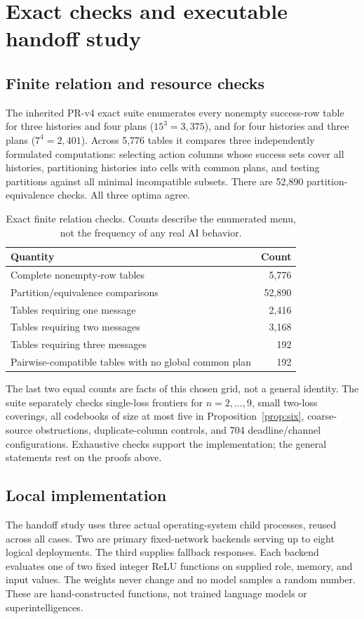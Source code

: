 \documentclass[11pt,a4paper]{article}
\theoremstyle{definition}\newtheorem{definition}{Definition}
\begin{document}
\section{Exact checks and executable handoff study}
\label{sec:evidence}
\subsection{Finite relation and resource checks}
The inherited PR-v4 exact suite enumerates every nonempty success-row table for three histories and four plans ($15^3=3,375$), and for four histories and three plans ($7^4=2,401$). Across 5,776 tables it compares three independently formulated computations: selecting action columns whose success sets cover all histories, partitioning histories into cells with common plans, and testing partitions against all minimal incompatible subsets. There are 52,890 partition-equivalence checks. All three optima agree.

\begin{table}[t]
\centering\small
\caption{Exact finite relation checks. Counts describe the enumerated menu, not the frequency of any real AI behavior.}
\label{tab:theory}
\begin{tabular}{@{}lr@{}}\toprule
Quantity & Count\\\midrule
Complete nonempty-row tables &5,776\\
Partition/equivalence comparisons &52,890\\
Tables requiring one message &2,416\\
Tables requiring two messages &3,168\\
Tables requiring three messages &192\\
Pairwise-compatible tables with no global common plan &192\\\bottomrule
\end{tabular}
\end{table}
The last two equal counts are facts of this chosen grid, not a general identity. The suite separately checks single-loss frontiers for $n=2,\ldots,9$, small two-loss coverings, all codebooks of size at most five in Proposition~\ref{prop:six}, coarse-source obstructions, duplicate-column controls, and 704 deadline/channel configurations. Exhaustive checks support the implementation; the general statements rest on the proofs above.

\subsection{Local implementation}
The handoff study uses three actual operating-system child processes, reused across all cases. Two are primary fixed-network backends serving up to eight logical deployments. The third supplies fallback responses. Each backend evaluates one of two fixed integer ReLU functions on supplied role, memory, and input values. The weights never change and no model samples a random number. These are hand-constructed functions, not trained language models or superintelligences.
\end{document}
